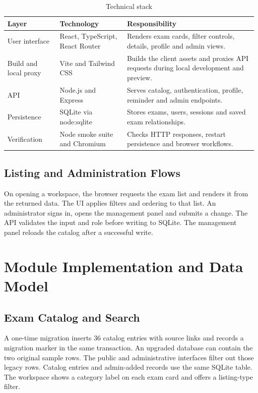 \documentclass[12pt,a4paper]{report}
\begin{document}
\begin{table}[H]
\centering\small
\begin{tabular}{>{\raggedright\arraybackslash}p{}>{\raggedright\arraybackslash}p{}>{\raggedright\arraybackslash}p{}}
\toprule
\textbf{Layer} & \textbf{Technology} & \textbf{Responsibility} \\ \midrule
User interface & React, TypeScript, React Router & Renders exam cards, filter controls, details, profile and admin views. \\
Build and local proxy & Vite and Tailwind CSS & Builds the client assets and proxies API requests during local development and preview. \\
API & Node.js and Express & Serves catalog, authentication, profile, reminder and admin endpoints. \\
Persistence & SQLite via node:sqlite & Stores exams, users, sessions and saved exam relationships. \\
Verification & Node smoke suite and Chromium & Checks HTTP responses, restart persistence and browser workflows. \\
\bottomrule
\end{tabular}
\setcounter{table}{0}
\caption{Technical stack}
\end{table}

\clearpage

\subsection{Listing and Administration Flows}

On opening a workspace, the browser requests the exam list and renders it from the returned data. The UI applies filters and ordering to that list. An administrator signs in, opens the management panel and submits a change. The API validates the input and role before writing to SQLite. The management panel reloads the catalog after a successful write.


\section{Module Implementation and Data Model}

\subsection{Exam Catalog and Search}

A one-time migration inserts 36 catalog entries with source links and records a migration marker in the same transaction. An upgraded database can contain the two original sample rows. The public and administrative interfaces filter out those legacy rows. Catalog entries and admin-added records use the same SQLite table. The workspace shows a category label on each exam card and offers a listing-type filter.
\end{document}
